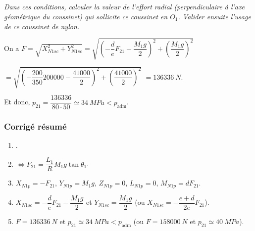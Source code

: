 \begin{multicols}{2}
\subparagraph{}\textit{Dans ces conditions, calculer la valeur de l’effort radial (perpendiculaire à l’axe géométrique du coussinet) qui sollicite ce coussinet en $O_1$.
Valider ensuite l’usage de ce coussinet de nylon.}
\ifprof
\begin{corrige}
On a 
$F = \sqrt{X_{N1sc}^2+Y_{N1sc}^2}
= \sqrt{\left(-\dfrac{d}{e}F_{21} - \dfrac{M_1g}{2} \right)^2+\left( \dfrac{M_1g}{2}\right)^2}$

$= \sqrt{\left(-\dfrac{200}{350}200000 -  \dfrac{41000}{2}\right)^2+\left( \dfrac{41000}{2}\right)^2}$
$=\SI{136336}{N}$.

Et donc, $p_{21}=\dfrac{136336}{80\cdot 50}\simeq \SI{34}{MPa}<p_{\text{adm}}$.
\end{corrige}
\else
\fi

\ifcolle
\else
\ifprof
\else
\subsubsection*{Corrigé résumé}
\footnotesize
\begin{enumerate}
\item .
\item $\Leftrightarrow F_{21}=\dfrac{L_1}{R} M_1g\tan\theta_1 $.
\item $X_{N1p} = - F_{21}$, $Y_{N1p}= M_1g$, $Z_{N1p}=0$, $
 L_{N1p} = {0}$, $M_{N1p} =dF_{21}$.
\item $X_{N1sc}=-\dfrac{d}{e}F_{21} - \dfrac{M_1g}{2}$ et $Y_{N1sc} = \dfrac{M_1g}{2}$ (ou $X_{N1sc}=-\dfrac{e+d}{2e}F_{21}$).
\item $F=\SI{136336}{N}$ et $p_{21}\simeq \SI{34}{MPa}<p_{\text{adm}}$ (ou $F=\SI{158000}{N}$ et $p_{21}\simeq \SI{40}{MPa}$).
\end{enumerate}
\normalsize
\fi
\fi


\ifprof
\else
\end{multicols}
\fi




